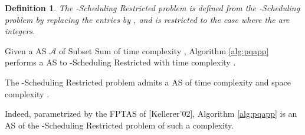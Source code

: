 \documentclass{llncs}
\newtheorem{defi}[theorem]{Definition}
\newcommand{\A}{\ensuremath{\mathcal A}\xspace}
\newcommand{\pqres}{ {\sc -Scheduling Restricted}\xspace}
\newcommand{\pqsched}{ {\sc -Scheduling}\xspace}
\begin{document}
\begin{defi}
\label{def:pqrest}
The \pqres problem is defined from the \pqsched problem by replacing the entries  by , and is restricted to the case where the  are integers.
\end{defi}






\begin{theorem}
\label{th:pqptas}
Given a AS \A of {\sc Subset Sum} of time complexity , Algorithm \ref{alg:pqapp} performs a AS to \pqres with time complexity .
\end{theorem}

\begin{coro}
The \pqres problem admits a AS of time complexity  and space complexity .

Indeed, parametrized by the FPTAS of [Kellerer'02], Algorithm \ref{alg:pqapp} is an AS of the \pqres problem of such a complexity.

\end{coro}
\end{document}
